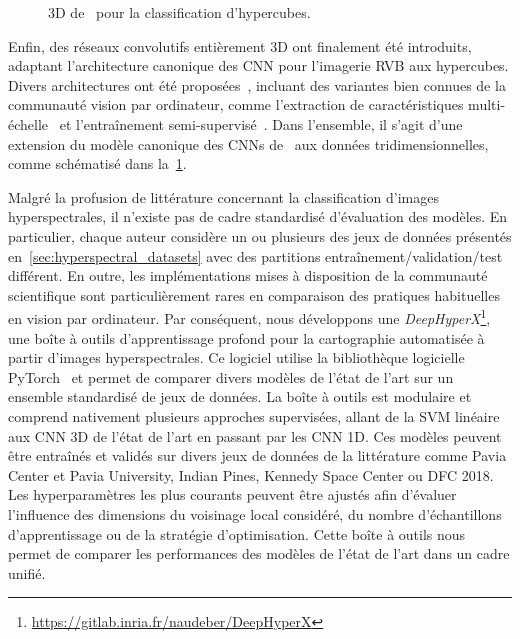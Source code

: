 \begin{figure}[h]
  \resizebox{\textwidth}{!}{}
  \caption[ 3D pour la classification d'hypercubes.]{ 3D de~\citet{chen_deep_2016} pour la classification d'hypercubes.}
  \label{fig:cnn3d_hsi}
\end{figure}

Enfin, des réseaux convolutifs entièrement 3D ont finalement été introduits, adaptant l'architecture canonique des \gls{CNN} pour l'imagerie \gls{RVB} aux hypercubes. Divers architectures ont été proposées~\cite{li_spectralspatial_2017}, incluant des variantes bien connues de la communauté vision par ordinateur, comme l'extraction de caractéristiques multi-échelle~\cite{he_multi-scale_2017} et l'entraînement semi-supervisé~\cite{liu_semi-supervised_2017}. Dans l'ensemble, il s'agit d'une extension du modèle canonique des \glspl{CNN} de~\citet{lecun_gradient-based_1998} aux données tridimensionnelles, comme schématisé dans la~\cref{fig:cnn3d_hsi}.

Malgré la profusion de littérature concernant la classification d'images hyperspectrales, il n'existe pas de cadre standardisé d'évaluation des modèles. En particulier, chaque auteur considère un ou plusieurs des jeux de données présentés en~\cref{sec:hyperspectral_datasets} avec des partitions entraînement/validation/test différent. En outre, les implémentations mises à disposition de la communauté scientifique sont particulièrement rares en comparaison des pratiques habituelles en vision par ordinateur. Par conséquent, nous développons une \emph{DeepHyperX}\footnote{\url{https://gitlab.inria.fr/naudeber/DeepHyperX}}, une boîte à outils d'apprentissage profond pour la cartographie automatisée à partir d'images hyperspectrales. Ce logiciel utilise la bibliothèque logicielle \gls{PyTorch}~\cite{noauthor_pytorch_2016} et permet de comparer divers modèles de l'état de l'art sur un ensemble standardisé de jeux de données. La boîte à outils est modulaire et comprend nativement plusieurs approches supervisées, allant de la \gls{SVM} linéaire aux \gls{CNN} 3D de l'état de l'art en passant par les \gls{CNN} 1D. Ces modèles peuvent être entraînés et validés sur divers jeux de données de la littérature comme Pavia Center et Pavia University, Indian Pines, Kennedy Space Center ou \gls{DFC} 2018. Les hyperparamètres les plus courants peuvent être ajustés afin d'évaluer l'influence des dimensions du voisinage local considéré, du nombre d'échantillons d'apprentissage ou de la stratégie d'optimisation. Cette boîte à outils nous permet de comparer les performances des modèles de l'état de l'art dans un cadre unifié.

